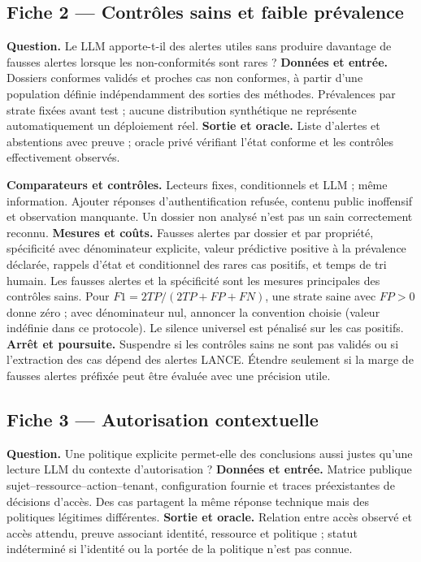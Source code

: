 \documentclass[11pt,a4paper]{article}
\begin{document}
\subsection{Fiche 2 --- Contrôles sains et faible prévalence}
\textbf{Question.} Le LLM apporte-t-il des alertes utiles sans produire davantage
de fausses alertes lorsque les non-conformités sont rares ?
\textbf{Données et entrée.} Dossiers conformes validés et proches cas non conformes,
à partir d'une population définie indépendamment des sorties des méthodes.
Prévalences par strate fixées avant test ; aucune distribution synthétique
ne représente automatiquement un déploiement réel.
\textbf{Sortie et oracle.} Liste d'alertes et abstentions avec preuve ; oracle
privé vérifiant l'état conforme et les contrôles effectivement observés.

\textbf{Comparateurs et contrôles.} Lecteurs fixes, conditionnels et LLM ; même
information. Ajouter réponses d'authentification refusée, contenu public
inoffensif et observation manquante. Un dossier non analysé n'est pas un sain
correctement reconnu.
\textbf{Mesures et coûts.} Fausses alertes par dossier et par propriété,
spécificité avec dénominateur explicite, valeur prédictive positive à la
prévalence déclarée, rappels d'état et conditionnel des rares cas positifs,
et temps de tri humain. Les fausses alertes et la spécificité sont les mesures
principales des contrôles sains. Pour $F1=2TP/(2TP+FP+FN)$, une strate saine
avec $FP>0$ donne zéro ; avec dénominateur nul, annoncer la convention choisie
(valeur indéfinie dans ce protocole). Le silence universel est pénalisé sur
les cas positifs.
\textbf{Arrêt et poursuite.} Suspendre si les contrôles sains ne sont pas validés
ou si l'extraction des cas dépend des alertes LANCE. Étendre seulement si la
marge de fausses alertes préfixée peut être évaluée avec une précision utile.

\subsection{Fiche 3 --- Autorisation contextuelle}
\textbf{Question.} Une politique explicite permet-elle des conclusions aussi
justes qu'une lecture LLM du contexte d'autorisation ?
\textbf{Données et entrée.} Matrice publique sujet--ressource--action--tenant,
configuration fournie et traces préexistantes de décisions d'accès. Des cas
partagent la même réponse technique mais des politiques légitimes différentes.
\textbf{Sortie et oracle.} Relation entre accès observé et accès attendu,
preuve associant identité, ressource et politique ; statut indéterminé si
l'identité ou la portée de la politique n'est pas connue.
\end{document}

